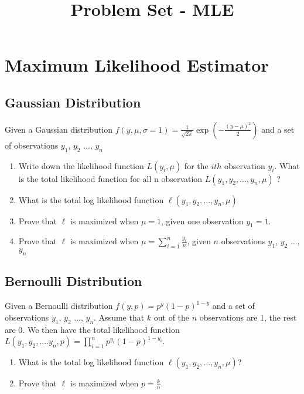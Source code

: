\documentclass{article}
\title{Problem Set - MLE} %
\begin{document}
\maketitle %
\thispagestyle{fancy}
\pagestyle{fancy}

\section{Maximum Likelihood Estimator}
\subsection{Gaussian Distribution}

Given a Gaussian distribution $f(y,\mu, \sigma=1)=\frac{1}{\sqrt{2\pi}}\exp(-\frac{(y-\mu)^2}{2})$ and a set of observations $y_1$, $y_2$ ..., $y_n$

\begin{enumerate}
\item Write down the likelihood function $L(y_i, \mu)$ for the $ith$ observation $y_i$. What is the total likelihood function for all n observation $L(y_1, y_2, ..., y_n, \mu)$ ?
\item What is the total log likelihood function $\ell(y_1, y_2, ..., y_n, \mu)$
\item  Prove that $\ell$ is maximized when $\mu=1$, given one observation $y_1=1$.
\item  Prove that $\ell$ is maximized when $\mu=\sum\limits_{i=1}^n \frac{y_i}{n}$, given $n$ observations $y_1$, $y_2$ ..., $y_n$
\end{enumerate}

\subsection{Bernoulli Distribution}
Given a Bernoulli distribution $f(y,p)=p^y(1-p)^{1-y}$ and a set of observations $y_1$, $y_2$ ..., $y_n$. Assume that $k$ out of the $n$ observations are 1, the rest are 0. We then have the total likelihood function $L(y_1, y_2, .... y_n, p)=\prod\limits_{i=1}^n p^{y_i} (1-p)^{1-y_i}$.


\begin{enumerate}
\item What is the total log likelihood function $\ell(y_1, y_2, ..., y_n, \mu)$?
\item  Prove that $\ell$ is maximized when $p=\frac{k}{n}$.
\end{enumerate}
\end{document}
